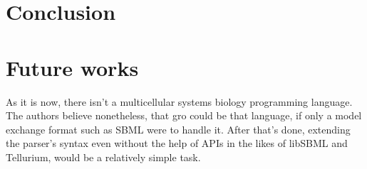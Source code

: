 \documentclass[12pt]{article}
\begin{document}
\section{Conclusion}
    \lipsum[1]
    
\section{Future works}
    As it is now, there isn't a multicellular systems biology programming language. The authors believe nonetheless, that gro could be that language, if only a model exchange format such as SBML were to handle it. After that's done, extending the parser's syntax even without the help of APIs in the likes of libSBML and Tellurium, would be a relatively simple task.



\end{document}
